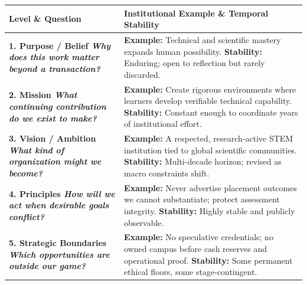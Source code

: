 \begin{table}[htbp]
\centering
\begin{tcolorbox}[
  enhanced,
  colback=white,
  colframe=BayesBorder!80!white,
  boxrule=0.4pt,
  arc=2pt,
  left=3pt,right=3pt,top=3pt,bottom=3pt,
  before skip=3pt,after skip=4pt
]
\scriptsize
\setlength{\tabcolsep}{3pt}
\renewcommand{\arraystretch}{1.18}
\begin{tabularx}{\linewidth}{@{} >{\bfseries\color{BayesInk}}p{2.2cm} >{\color{BayesInk}}X @{}}
\toprule
\textbf{Level \& Question} & \textbf{Institutional Example \& Temporal Stability} \\
\midrule
1. Purpose / Belief\newline
\textit{Why does this work matter beyond a transaction?} & 
\textbf{Example:} Technical and scientific mastery expands human possibility.\newline
\textbf{Stability:} Enduring; open to reflection but rarely discarded. \\
\midrule
2. Mission\newline
\textit{What continuing contribution do we exist to make?} & 
\textbf{Example:} Create rigorous environments where learners develop verifiable technical capability.\newline
\textbf{Stability:} Constant enough to coordinate years of institutional effort. \\
\midrule
3. Vision / Ambition\newline
\textit{What kind of organization might we become?} & 
\textbf{Example:} A respected, research-active STEM institution tied to global scientific communities.\newline
\textbf{Stability:} Multi-decade horizon; revised as macro constraints shift. \\
\midrule
4. Principles\newline
\textit{How will we act when desirable goals conflict?} & 
\textbf{Example:} Never advertise placement outcomes we cannot substantiate; protect assessment integrity.\newline
\textbf{Stability:} Highly stable and publicly observable. \\
\midrule
5. Strategic Boundaries\newline
\textit{Which opportunities are outside our game?} & 
\textbf{Example:} No speculative credentials; no owned campus before cash reserves and operational proof.\newline
\textbf{Stability:} Some permanent ethical floors, some stage-contingent. \\

\end{tabularx}
\end{tcolorbox}
\end{table}
